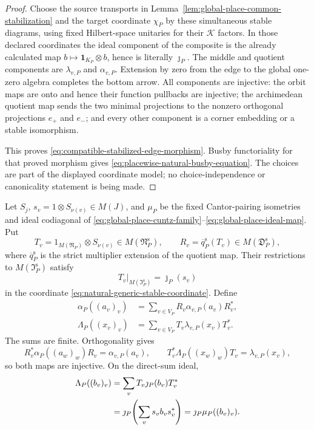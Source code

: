 \begin{proof}
Choose the source transports in
Lemma~\ref{lem:global-place-common-stabilization} and the target coordinate
$\chi_P$ by these simultaneous stable diagrams, using fixed Hilbert-space
unitaries for their $\mathcal K$ factors.  In those declared coordinates the
ideal component of the composite is the already calculated map
$b\mapsto\mathbf1_{K_P}\otimes b$, hence is literally $\jmath_P$.  The
middle and quotient components are $\lambda_{v,P}$ and $\alpha_{v,P}$.
Extension by zero from the edge to the global one-zero algebra completes the
bottom arrow.  All components are injective: the orbit maps are onto and
hence their function pullbacks are injective; the archimedean quotient map
sends the two minimal projections to the nonzero orthogonal projections
$e_+$ and $e_-$; and every other component is a corner embedding or a stable
isomorphism.

This proves \eqref{eq:compatible-stabilized-edge-morphism}.  Busby
functoriality for that proved morphism gives
\eqref{eq:placewise-natural-busby-equation}.  The choices are part of the
displayed coordinate model; no choice-independence or canonicality statement
is being made.
\end{proof}

Let $S_j$, $s_v=1\otimes S_{\nu(v)}\in M(J)$, and $\mu_P$ be the fixed
Cantor-pairing isometries and ideal codiagonal of
\eqref{eq:global-place-cuntz-family}--\eqref{eq:global-place-ideal-map}.
Put
\[
 T_v=1_{M(\mathfrak N_P)}\otimes S_{\nu(v)}
 \in M(\mathfrak N_P^{\mathrm s}),
 \qquad
 R_v=\overline q_P^{\mathrm s}(T_v)
 \in M(\mathfrak D_P^{\mathrm s}),
\]
where $\overline q_P^{\mathrm s}$ is the strict multiplier extension of the
quotient map.
Their restrictions to $M(\mathfrak I_P^{\mathrm s})$ satisfy
\begin{equation}
 T_v|_{M(\mathfrak I_P^{\mathrm s})}
 =\overline\jmath_P(s_v)
 \label{eq:natural-corner-compatibility}
\end{equation}
in the coordinate \eqref{eq:natural-generic-stable-coordinate}.  Define
\begin{align}
 \alpha_P((a_v)_v)
   &=\sum_{v\in V_P}R_v\alpha_{v,P}(a_v)R_v^*,
 \label{eq:stable-to-natural-quotient-map}\\
 \Lambda_P((x_v)_v)
   &=\sum_{v\in V_P}T_v\lambda_{v,P}(x_v)T_v^*.
 \label{eq:stable-to-natural-direct-sum-middle-map}
\end{align}
The sums are finite.  Orthogonality gives
\[
 R_v^*\alpha_P((a_w)_w)R_v=\alpha_{v,P}(a_v),
 \qquad
 T_v^*\Lambda_P((x_w)_w)T_v=\lambda_{v,P}(x_v),
\]
so both maps are injective.  On the direct-sum ideal,
\begin{align}
 \Lambda_P((b_v)_v)
 &=\sum_vT_v\jmath_P(b_v)T_v^*\notag\\
 &=\jmath_P\!\left(\sum_vs_vb_vs_v^*\right)
 =\jmath_P\mu_P((b_v)_v).
 \label{eq:stable-to-natural-ideal-factorization}
\end{align}

